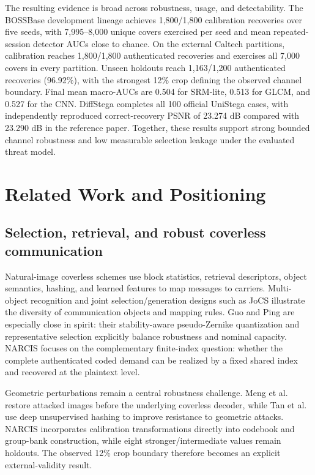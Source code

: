 The resulting evidence is broad across robustness, usage, and detectability. The BOSSBase development lineage achieves 1,800/1,800 calibration recoveries over five seeds, with 7,995--8,000 unique covers exercised per seed and mean repeated-session detector AUCs close to chance. On the external Caltech partitions, calibration reaches 1,800/1,800 authenticated recoveries and exercises all 7,000 covers in every partition. Unseen holdouts reach 1,163/1,200 authenticated recoveries (96.92\%), with the strongest 12\% crop defining the observed channel boundary. Final mean macro-AUCs are 0.504 for SRM-lite, 0.513 for GLCM, and 0.527 for the CNN. DiffStega completes all 100 official UniStega cases, with independently reproduced correct-recovery PSNR of 23.274 dB compared with 23.290 dB in the reference paper. Together, these results support strong bounded channel robustness and low measurable selection leakage under the evaluated threat model.

\section{Related Work and Positioning}
\label{sec:related}

\subsection{Selection, retrieval, and robust coverless communication}

Natural-image coverless schemes use block statistics, retrieval descriptors, object semantics, hashing, and learned features to map messages to carriers. Multi-object recognition \cite{luo2021multiobject} and joint selection/generation designs such as JoCS \cite{ren2024robust} illustrate the diversity of communication objects and mapping rules. Guo and Ping \cite{guo2026capacity} are especially close in spirit: their stability-aware pseudo-Zernike quantization and representative selection explicitly balance robustness and nominal capacity. NARCIS focuses on the complementary finite-index question: whether the complete authenticated coded demand can be realized by a fixed shared index and recovered at the plaintext level.

Geometric perturbations remain a central robustness challenge. Meng et al. \cite{meng2025restoration} restore attacked images before the underlying coverless decoder, while Tan et al. \cite{tan2026hashing} use deep unsupervised hashing to improve resistance to geometric attacks. NARCIS incorporates calibration transformations directly into codebook and group-bank construction, while eight stronger/intermediate values remain holdouts. The observed 12\% crop boundary therefore becomes an explicit external-validity result.

